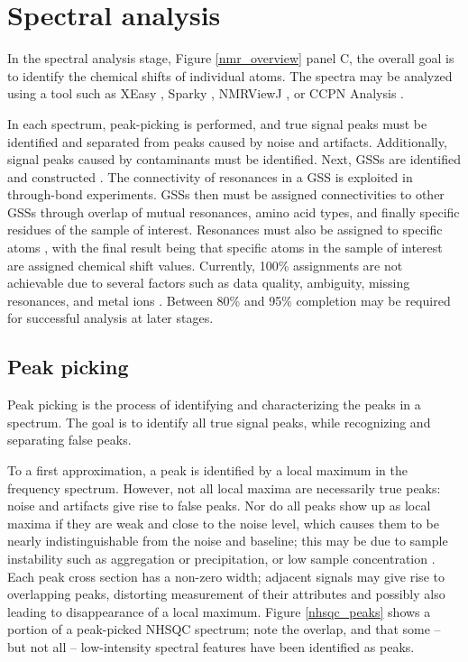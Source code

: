 \section{Spectral analysis}

In the spectral analysis stage, Figure \ref{nmr_overview} panel C,
the overall goal is to identify the chemical shifts of individual atoms.
The spectra may be analyzed using a tool such as XEasy \cite{xeasy}, 
Sparky \cite{sparky}, NMRViewJ \cite{nmrviewj}, or CCPN Analysis \cite{ccpn}.  

In each spectrum, peak-picking is performed, and true signal peaks must 
be identified and separated from peaks caused by noise and artifacts.  
Additionally, signal peaks caused by contaminants must be identified.  
Next, GSSs are identified and constructed \cite{ccpn}. 
The connectivity of resonances in a GSS is exploited 
in through-bond experiments.  GSSs then must be assigned 
connectivities to other GSSs through overlap of mutual resonances, 
amino acid types, and finally specific residues of the sample of interest. 
Resonances must also be assigned to specific atoms \cite{ccpn}, 
with the final result being that specific atoms in the sample of interest 
are assigned chemical shift values.  Currently, 100\% assignments are not 
achievable due to several factors such as data quality, ambiguity,
missing resonances, and metal ions \cite{guerry2011automated}.
Between 80\% and 95\% completion may be required \cite{williamson2009automated}
for successful analysis at later stages.

\subsection{Peak picking}
Peak picking is the process of identifying and characterizing the peaks in 
a spectrum.  The goal is to identify all true signal peaks, while recognizing
and separating false peaks.

To a first approximation, a peak is identified by a local maximum in the 
frequency spectrum.  However, not all local maxima are necessarily true
peaks: noise and artifacts give rise to false peaks.  Nor do all peaks show 
up as local maxima if 
they are weak and close to the noise level, which causes them 
to be nearly indistinguishable from the noise and baseline; this may be due to 
sample instability such as aggregation or precipitation, or low sample 
concentration \cite{picky, munin, korzhnev2001munin, apart, autopsy, pine}
\cite{williamson2009automated, guntert2009automated, altieri2004automation,
baran2004automated}.
Each peak cross section has a non-zero width; adjacent signals may give rise
to overlapping peaks, distorting measurement of their attributes and possibly
also leading to disappearance of a local maximum.
Figure \ref{nhsqc_peaks} shows a portion of a peak-picked
NHSQC spectrum; note the overlap, and that some -- but not
all -- low-intensity spectral features have been identified as peaks.

